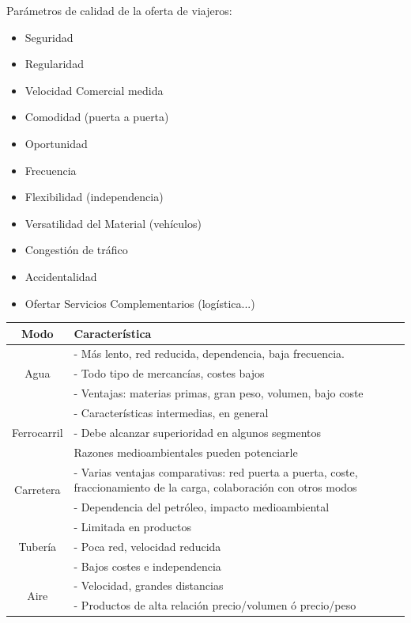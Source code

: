 Parámetros de calidad de la oferta de viajeros:
\begin{itemize}
    \item Seguridad
    \item Regularidad
    \item Velocidad Comercial medida
    \item Comodidad (puerta a puerta)
    \item Oportunidad
    \item Frecuencia
    \item Flexibilidad (independencia)
    \item Versatilidad del Material (vehículos)
    \item Congestión de tráfico
    \item Accidentalidad
    \item Ofertar Servicios Complementarios (logística...)
\end{itemize}

\begin{strip}
    \centering
    \begin{tabular}{| c | p{12cm} |}
        \hline
        Modo & Característica \\
        \hline
        \multirow{3}{*}{Agua}   & - Más lento, red reducida, dependencia, baja frecuencia. \\
                                & - Todo tipo de mercancías, costes bajos \\
                                & - Ventajas: materias primas, gran peso, volumen, bajo coste \\
        \hline
        \multirow{3}{*}{Ferrocarril}    & - Características intermedias, en general \\
                                        & - Debe alcanzar superioridad en algunos segmentos \\
                                        & Razones medioambientales pueden potenciarle \\
        \hline
        \multirow{2}{*}{Carretera}  & - Varias ventajas comparativas: red puerta a puerta, coste, fraccionamiento de la carga, colaboración con otros modos \\
                                    &  - Dependencia del petróleo, impacto medioambiental \\
        \hline
        \multirow{3}{*}{Tubería}    & - Limitada en productos \\
                                    & - Poca red, velocidad reducida \\
                                    & - Bajos costes e independencia \\
        \hline
        \multirow{2}{*}{Aire}   & - Velocidad, grandes distancias \\
                                & - Productos de alta relación precio/volumen ó precio/peso \\
        \hline
    \end{tabular}
\end{strip}

